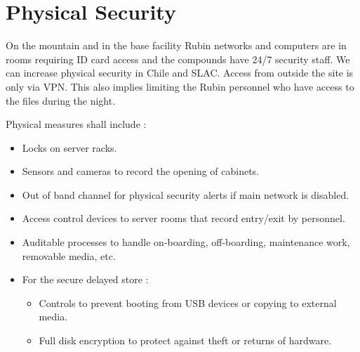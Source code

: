 \section {Physical Security}

On the mountain and in the base facility Rubin networks and computers are in rooms requiring ID card access and the compounds have 24/7 security staff. We can increase physical security in Chile and SLAC.
Access from outside the site is only via VPN.
This also implies limiting the Rubin personnel who have access to the files during the night.


 {
Physical measures shall include :
\begin{itemize}
\item Locks on server racks.
\item Sensors and cameras to record the opening of cabinets.
\item Out of band channel for physical security alerts if main network is disabled.
\item Access control devices to server rooms that record entry/exit by personnel.
\item Auditable processes to handle on-boarding, off-boarding, maintenance work, removable media, etc.
\item For the secure delayed store :
	\begin{itemize}
	\item Controls to prevent booting from USB devices or copying to external media.
	\item Full disk encryption to protect against theft or returns of hardware.
	\end{itemize}
\end{itemize}

}




